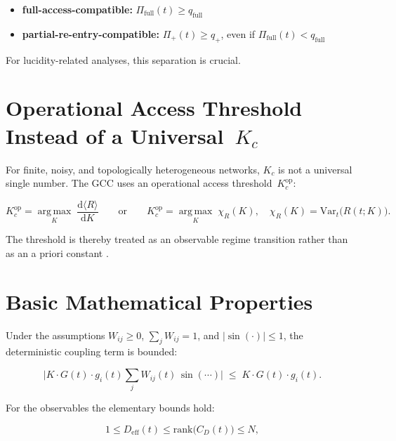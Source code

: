 \documentclass[11pt,a4paper]{article}
\theoremstyle{plain}
\theoremstyle{definition}
\theoremstyle{remark}
\newcommand{\Deff}{D_{\mathrm{eff}}}
\newcommand{\Kcop}{K_c^{\mathrm{op}}}
\begin{document}
\begin{itemize}
\item \textbf{full-access-compatible:} $\Pi_{\mathrm{full}}(t) \geq q_{\mathrm{full}}$
\item \textbf{partial-re-entry-compatible:} $\Pi_{+}(t) \geq q_{+}$, even if $\Pi_{\mathrm{full}}(t) < q_{\mathrm{full}}$
\end{itemize}

For lucidity-related analyses, this separation is crucial.


\section{Operational Access Threshold Instead of a Universal~$K_c$}
\label{sec:schwelle}

For finite, noisy, and topologically heterogeneous networks, $K_c$ is not a universal single number. The GCC uses an operational access threshold~$\Kcop$:

\begin{equation}
\label{eq:Kcop}
\Kcop = \operatorname*{arg\,max}_{K}\;\frac{\mathrm{d}\langle R \rangle}{\mathrm{d}K}
\qquad\text{or}\qquad
\Kcop = \operatorname*{arg\,max}_{K}\;\chi_R(K), \quad \chi_R(K) = \mathrm{Var}_t\!\bigl(R(t;K)\bigr).
\end{equation}

The threshold is thereby treated as an observable regime transition rather than as an a priori constant \citep{restrepo2005,arenas2008}.


\section{Basic Mathematical Properties}
\label{sec:grundsaetze}

Under the assumptions $W_{ij} \geq 0$, $\sum_j W_{ij} = 1$, and $|\sin(\cdot)| \leq 1$, the deterministic coupling term is bounded:

\begin{equation}
\bigl|K \cdot G(t) \cdot g_i(t) \sum_j W_{ij}(t)\,\sin(\cdots)\bigr| \;\leq\; K \cdot G(t) \cdot g_i(t).
\end{equation}

For the observables the elementary bounds hold:

\begin{equation}
1 \leq \Deff(t) \leq \mathrm{rank}\bigl(C_D(t)\bigr) \leq N,
\end{equation}
\end{document}
